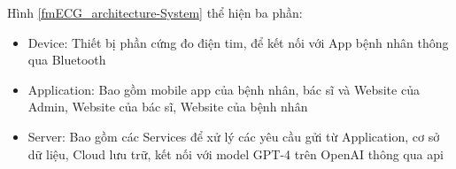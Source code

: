 Hình \ref{fmECG_architecture-System} thể hiện ba phần: 

\begin{adjustwidth}{1.5em}{}
\begin{itemize}
  \item Device: Thiết bị phần cứng đo điện tim, để kết nối với App bệnh nhân thông qua Bluetooth 
  \item Application: Bao gồm mobile app của bệnh nhân, bác sĩ và Website của Admin, Website của bác sĩ, Website của bệnh nhân
  \item Server: Bao gồm các Services để xử lý các yêu cầu gửi từ Application, cơ sở dữ liệu, Cloud lưu trữ, kết nối với model GPT-4 trên OpenAI thông qua api
\end{itemize}
\end{adjustwidth}

